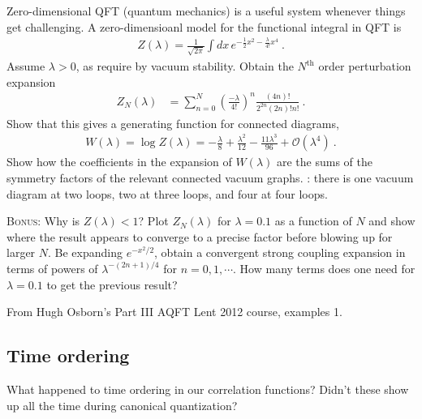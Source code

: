 \documentclass[12pt]{article}
\numberwithin{equation}{subsection}    %
\begin{document}
Zero-dimensional QFT (quantum mechanics) is a useful system whenever things get challenging. A zero-dimensioanl model for the functional integral in QFT is
\begin{align}
	Z(\lambda) = \frac{1}{\sqrt{2\pi}} 
	\int dx\, e^{-\frac{1}{2} x^2 - \frac{\lambda}{4!}x^4} \ .
\end{align}
Assume $\lambda > 0$, as require by vacuum stability. Obtain the $N^\text{th}$ order perturbation expansion
\begin{align}
	Z_N(\lambda) 
	&= 
	\sum_{n=0}^N \left(\frac{-\lambda}{4!}\right)^n \frac{(4n)!}{2^{2n}(2n)! n!} \ .
\end{align}
Show that this gives a generating function for connected diagrams,
\begin{align}
	W(\lambda) = \log Z(\lambda) 
	= -\frac{\lambda}{8} + \frac{\lambda^2}{12} - \frac{11\lambda^3}{96} +
	\mathcal O(\lambda^4) \ .
\end{align}
Show how the coefficients in the expansion of $W(\lambda)$ are the sums of the symmetry factors of the relevant connected vacuum graphs. : there is one vacuum diagram at two loops, two at three loops, and four at four loops. 


\textsc{Bonus:} Why is $Z(\lambda) < 1$? Plot $Z_N(\lambda)$ for $\lambda = 0.1$ as a function of $N$ and show where the result appears to converge to a precise factor before blowing up for larger $N$. Be expanding $e^{-x^2/2}$, obtain a convergent strong coupling expansion in terms of powers of $\lambda^{-(2n+1)/4}$ for $n=0,1,\cdots$. How many terms does one need for $\lambda=0.1$ to get the previous result?

{\footnotesize From Hugh Osborn's Part III AQFT Lent 2012 course, examples 1.}

\subsection{Time ordering}

What happened to time ordering in our correlation functions? Didn't these show up all the time during canonical quantization?
\end{document}
